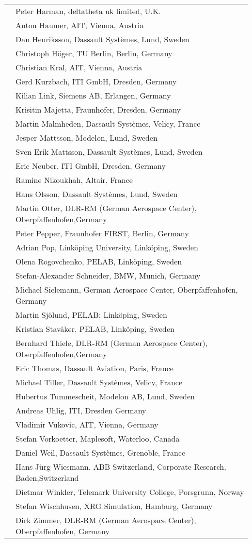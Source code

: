 \begin{longtable}{p{0.3cm}p{14cm}}
&Peter Harman, deltatheta uk limited, U.K.\\
&Anton Haumer, AIT, Vienna, Austria\\
&Dan Henriksson, Dassault Systèmes, Lund, Sweden\\
&Christoph Höger, TU Berlin, Berlin, Germany\\
&Christian Kral, AIT, Vienna, Austria\\
&Gerd Kurzbach, ITI GmbH, Dresden, Germany\\
&Kilian Link, Siemens AB, Erlangen, Germany\\
&Krisitin Majetta, Fraunhofer, Dresden, Germany\\
&Martin Malmheden, Dassault Systèmes, Velicy, France\\
&Jesper Mattsson, Modelon, Lund, Sweden\\
&Sven Erik Mattsson, Dassault Systèmes, Lund, Sweden\\
&Eric Neuber, ITI GmbH, Dresden, Germany\\
&Ramine Nikoukhah, Altair, France\\
&Hans Olsson, Dassault Systèmes, Lund, Sweden\\
&Martin Otter, DLR-RM (German Aerospace Center), Oberpfaffenhofen,Germany\\
&Peter Pepper, Fraunhofer FIRST, Berlin, Germany\\
&Adrian Pop, Linköping University, Linköping, Sweden\\
&Olena Rogovchenko, PELAB, Linköping, Sweden\\
&Stefan-Alexander Schneider, BMW, Munich, Germany\\
&Michael Sielemann, German Aerospace Center, Oberpfaffenhofen, Germany\\
&Martin Sjölund, PELAB; Linköping, Sweden\\
&Kristian Stavåker, PELAB, Linköping, Sweden\\
&Bernhard Thiele, DLR-RM (German Aerospace Center), Oberpfaffenhofen,Germany\\
&Eric Thomas, Dassault Aviation, Paris, France\\
&Michael Tiller, Dassault Systèmes, Velicy, France\\
&Hubertus Tummescheit, Modelon AB, Lund, Sweden\\
&Andreas Uhlig, ITI, Dresden Germany\\
&Vladimir Vukovic, AIT, Vienna, Germany\\
&Stefan Vorkoetter, Maplesoft, Waterloo, Canada\\
&Daniel Weil, Dassault Systèmes, Grenoble, France\\
&Hans-Jürg Wiesmann, ABB Switzerland, Corporate Research, Baden,Switzerland\\
&Dietmar Winkler, Telemark University College, Porsgrunn, Norway\\
&Stefan Wischhusen, XRG Simulation, Hamburg, Germany\\
&Dirk Zimmer, DLR-RM (German Aerospace Center), Oberpfaffenhofen, Germany
\end{longtable}

